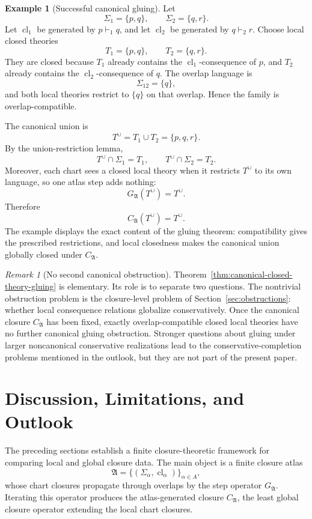 \documentclass[11pt]{amsart}
\numberwithin{equation}{section}
\theoremstyle{plain}
\theoremstyle{definition}
\newtheorem{example}[theorem]{Example}
\theoremstyle{remark}
\newtheorem{remark}[theorem]{Remark}
\newcommand{\Cl}{\operatorname{cl}}
\newcommand{\A}{\mathfrak A}
\newcommand{\Sig}{\Sigma}
\newcommand{\CA}{C_{\mathfrak A}}
\newcommand{\GA}{G_{\mathfrak A}}
\newcommand{\Tcup}{T^{\cup}}
\begin{document}
\begin{example}[Successful canonical gluing]
\label{ex:successful-canonical-gluing}
Let
\[
  \Sig_1=\{p,q\},
  \qquad
  \Sig_2=\{q,r\}.
\]
Let \(\Cl_1\) be generated by \(p\vdash_1 q\), and let \(\Cl_2\) be generated by \(q\vdash_2 r\).  Choose local closed theories
\[
  T_1=\{p,q\},
  \qquad
  T_2=\{q,r\}.
\]
They are closed because \(T_1\) already contains the \(\Cl_1\)-consequence of \(p\), and \(T_2\) already contains the \(\Cl_2\)-consequence of \(q\).  The overlap language is
\[
  \Sig_{12}=\{q\},
\]
and both local theories restrict to \(\{q\}\) on that overlap.  Hence the family is overlap-compatible.

The canonical union is
\[
  \Tcup=T_1\cup T_2=\{p,q,r\}.
\]
By the union-restriction lemma,
\[
  \Tcup\cap\Sig_1=T_1,
  \qquad
  \Tcup\cap\Sig_2=T_2.
\]
Moreover, each chart sees a closed local theory when it restricts \(\Tcup\) to its own language, so one atlas step adds nothing:
\[
  \GA(\Tcup)=\Tcup.
\]
Therefore
\[
  \CA(\Tcup)=\Tcup.
\]
The example displays the exact content of the gluing theorem: compatibility gives the prescribed restrictions, and local closedness makes the canonical union globally closed under \(\CA\).
\end{example}

\begin{remark}[No second canonical obstruction]
Theorem~\ref{thm:canonical-closed-theory-gluing} is elementary.  Its role is to separate two questions.  The nontrivial obstruction problem is the closure-level problem of Section~\ref{sec:obstructions}: whether local consequence relations globalize conservatively.  Once the canonical closure \(\CA\) has been fixed, exactly overlap-compatible closed local theories have no further canonical gluing obstruction.  Stronger questions about gluing under larger noncanonical conservative realizations lead to the conservative-completion problems mentioned in the outlook, but they are not part of the present paper.
\end{remark}


\section{Discussion, Limitations, and Outlook}
\label{sec:conclusion}

The preceding sections establish a finite closure-theoretic framework for comparing local and global closure data.  The main object is a finite closure atlas
\[
  \A=\{(\Sig_\alpha,\Cl_\alpha)\}_{\alpha\in A},
\]
whose chart closures propagate through overlaps by the step operator \(G_{\A}\).  Iterating this operator produces the atlas-generated closure \(\CA\), the least global closure operator extending the local chart closures.
\end{document}
